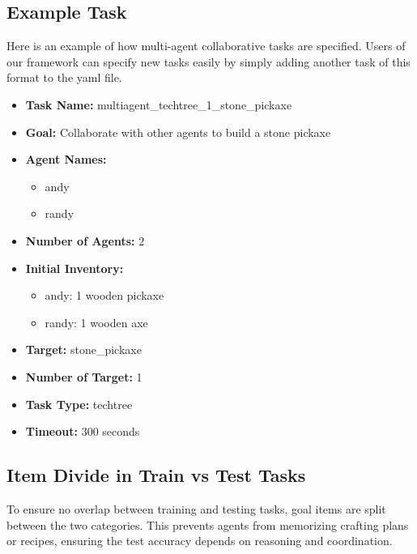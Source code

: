 \documentclass{article}
\begin{document}
\subsection{Example Task} \label{appendix : example_task}
Here is an example of how multi-agent collaborative tasks are specified. Users of our framework can specify new tasks easily by simply adding another task of this format to the yaml file. 
\begin{itemize}
    \item \textbf{Task Name:} multiagent\_techtree\_1\_stone\_pickaxe
    \item \textbf{Goal:} Collaborate with other agents to build a stone pickaxe
    \item \textbf{Agent Names:} 
        \begin{itemize}
            \item andy
            \item randy
        \end{itemize}
    \item \textbf{Number of Agents:} 2
    \item \textbf{Initial Inventory:}
        \begin{itemize}
            \item andy: 1 wooden pickaxe
            \item randy: 1 wooden axe
        \end{itemize}
    \item \textbf{Target:} stone\_pickaxe
    \item \textbf{Number of Target:} 1
    \item \textbf{Task Type:} techtree
    \item \textbf{Timeout:} 300 seconds
\end{itemize}

\subsection{Item Divide in Train vs Test Tasks} \label{appendix:train-test-divide}
To ensure no overlap between training and testing tasks, goal items are split between the two categories. This prevents agents from memorizing crafting plans or recipes, ensuring the test accuracy depends on reasoning and coordination.
\end{document}

